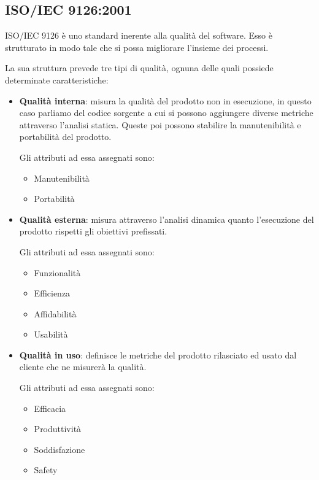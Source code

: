 	\subsection{ISO/IEC 9126:2001}
	ISO/IEC 9126 è uno standard inerente alla qualità del software. Esso è strutturato in modo tale che si possa migliorare l'insieme dei processi.
	
	La sua struttura prevede tre tipi di qualità, ognuna delle quali possiede determinate caratteristiche:
	
	\begin{itemize}
		\item \textbf{Qualità interna}: misura la qualità del prodotto non in esecuzione, in questo caso parliamo del codice sorgente a cui si possono aggiungere diverse metriche attraverso l'analisi statica. Queste poi possono stabilire la manutenibilità e portabilità del prodotto.
		
		Gli attributi ad essa assegnati sono:
		
		\begin{itemize}
			\item Manutenibilità
			\item Portabilità
		\end{itemize}
	
		\item \textbf{Qualità esterna}: misura attraverso l'analisi dinamica quanto l'esecuzione del prodotto rispetti gli obiettivi prefissati.
		
		Gli attributi ad essa assegnati sono:
		
			\begin{itemize}
			\item Funzionalità
			\item Efficienza
			\item Affidabilità
			\item Usabilità
		\end{itemize}
	
		\item \textbf{Qualità in uso}: definisce le metriche del prodotto rilasciato ed usato dal cliente che ne misurerà la qualità.
		
		Gli attributi ad essa assegnati sono:
		
		\begin{itemize}
			\item Efficacia
			\item Produttività
			\item Soddisfazione
			\item Safety
		\end{itemize}
	\end{itemize}

